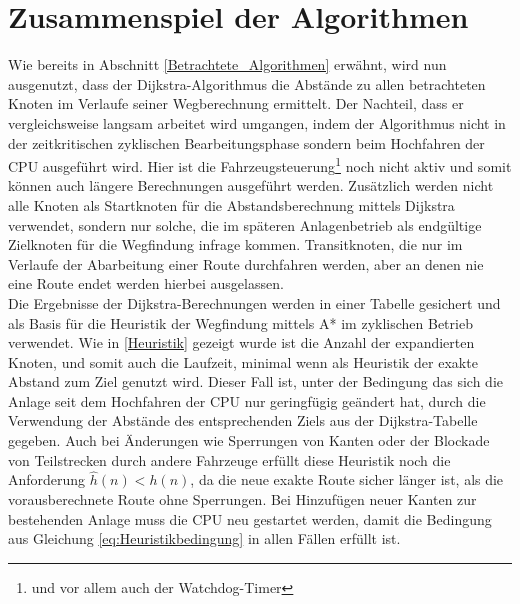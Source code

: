 	\section{Zusammenspiel der Algorithmen}
		\label{Verwendung_Alg}
		Wie bereits in Abschnitt \ref{Betrachtete_Algorithmen} erwähnt, wird nun ausgenutzt, dass der Dijkstra-Algorithmus die Abstände zu allen betrachteten Knoten im Verlaufe seiner Wegberechnung ermittelt.  Der Nachteil, dass er vergleichsweise langsam arbeitet wird umgangen, indem der Algorithmus nicht in der zeitkritischen zyklischen Bearbeitungsphase sondern beim Hochfahren der CPU ausgeführt wird. Hier ist die Fahrzeugsteuerung\footnote{und vor allem auch der Watchdog-Timer} noch nicht aktiv und somit können auch längere Berechnungen ausgeführt werden. Zusätzlich werden nicht alle Knoten als Startknoten für die Abstandsberechnung mittels Dijkstra verwendet, sondern nur solche, die im späteren Anlagenbetrieb als endgültige Zielknoten für die Wegfindung infrage kommen. Transitknoten, die nur im Verlaufe der Abarbeitung einer Route durchfahren werden, aber an denen nie eine Route endet werden hierbei ausgelassen.\\
		Die Ergebnisse der Dijkstra-Berechnungen werden in einer Tabelle gesichert und als Basis für die Heuristik der Wegfindung mittels A* im zyklischen Betrieb verwendet. Wie in \ref{Heuristik} gezeigt wurde ist die Anzahl der expandierten Knoten, und somit auch die Laufzeit, minimal wenn als Heuristik der exakte  Abstand zum Ziel genutzt wird. Dieser Fall ist, unter der Bedingung das sich die Anlage seit dem Hochfahren der CPU nur geringfügig geändert hat, durch die Verwendung der Abstände des entsprechenden Ziels aus der Dijkstra-Tabelle gegeben. Auch bei Änderungen wie Sperrungen von Kanten oder der Blockade von Teilstrecken durch andere Fahrzeuge erfüllt diese Heuristik noch die Anforderung $\hat{h}(n)<h(n)$, da die neue exakte Route sicher länger ist, als die vorausberechnete Route ohne Sperrungen. Bei Hinzufügen neuer Kanten zur bestehenden Anlage muss die CPU neu gestartet werden, damit die Bedingung aus Gleichung \ref{eq:Heuristikbedingung} in allen Fällen erfüllt ist.
		
		
				





